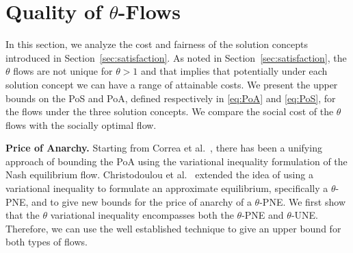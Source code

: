 \section{Quality of $\theta$-Flows}\label{sec:social}
In this section, we analyze the cost and fairness of the solution concepts introduced in Section~\ref{sec:satisfaction}.
As noted in Section~\ref{sec:satisfaction}, the $\theta$ flows are not unique for $\theta>1$ and that implies that potentially under each solution concept we can have a range of attainable costs. We present the upper bounds on the PoS and PoA, defined respectively in \eqref{eq:PoA} and \eqref{eq:PoS},  for the flows under the three solution concepts. We compare the social cost of the $\theta$ flows with the socially optimal flow.
 
\textbf{Price of Anarchy.} Starting from Correa et al.~\cite{correa2008geometric},  there has been a unifying approach of bounding the PoA using the variational inequality formulation of the Nash equilibrium flow.  Christodoulou et al.~\cite{christodoulou2011performance}  extended the idea of using a variational inequality to formulate an approximate equilibrium, specifically a $\theta$-PNE, and to give new bounds for the price of anarchy of a $\theta$-PNE. We first show that the $\theta$ variational inequality encompasses both the $\theta$-PNE and $\theta$-UNE. Therefore, we can use the well established technique to give an upper bound for both types of flows.

